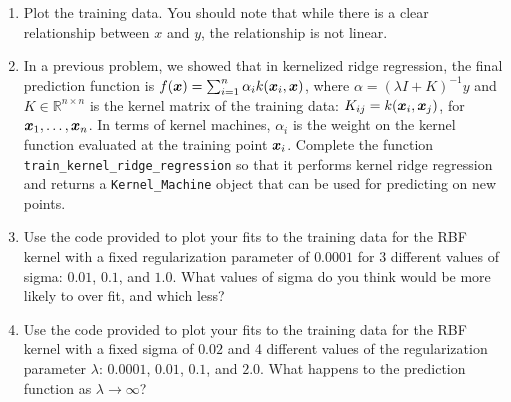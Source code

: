 \documentclass{article}
\theoremstyle{plain}
\theoremstyle{definition}
\begin{document}
\begin{enumerate}
  \setcounter{enumi}{\value{saveenum}}
\item Plot the training data. You should note that while there is a clear
relationship between $x$ and $y$, the relationship is not linear.
\item In a previous problem, we showed that in kernelized ridge regression,
the final prediction function is $f(\boldsymbol{x})=\sum_{i=1}^{n}\alpha_{i}k(\boldsymbol{x}_{i},\boldsymbol{x})$,
where $\alpha=(\lambda I+K)^{-1}y$ and $K\in\mathbb{R}^{n\times n}$
is the kernel matrix of the training data: $K_{ij}=k(\boldsymbol{x}_{i},\boldsymbol{x}_{j})$,
for $\boldsymbol{x}_{1},\ldots, \boldsymbol{x}_{n}$. In terms of kernel machines, $\alpha_{i}$
is the weight on the kernel function evaluated at the training point
$\boldsymbol{x}_{i}$. Complete the function \texttt{train\_kernel\_ridge\_regression}
so that it performs kernel ridge regression and returns a \texttt{Kernel\_Machine}
object that can be used for predicting on new points. 

\item Use the code provided to plot your fits to the training data for the
RBF kernel with a fixed regularization parameter of $0.0001$ for
3 different values of sigma: $0.01$, $0.1$, and $1.0$. What values
of sigma do you think would be more likely to over fit, and which
less? \\

\item Use the code provided to plot your fits to the training data for the
RBF kernel with a fixed sigma of $0.02$ and 4 different values of
the regularization parameter $\lambda$: $0.0001$, $0.01$, $0.1$,
and $2.0$. What happens to the prediction function as $\lambda\to\infty$?



\end{enumerate}
\end{document}
